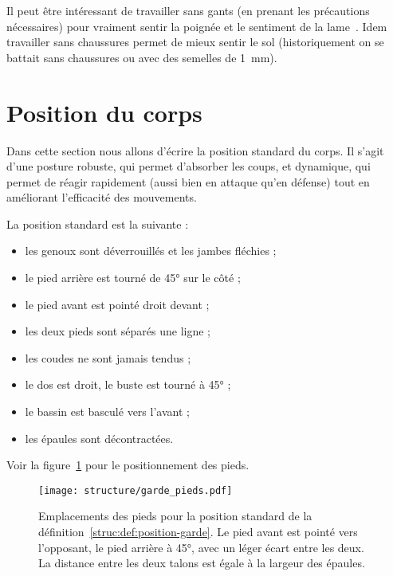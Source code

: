 Il peut être intéressant de travailler sans gants (en prenant les précautions nécessaires) pour vraiment sentir la poignée et le sentiment de la lame~\cite{enzi:dijon:messer_inner:2015}.
Idem travailler sans chaussures permet de mieux sentir le sol (historiquement on se battait sans chaussures ou avec des semelles de \SI{1}{mm}).


\section{Position du corps}


Dans cette section nous allons d'écrire la position standard du corps.
Il s'agit d'une posture robuste, qui permet d'absorber les coups, et dynamique, qui permet de réagir rapidement (aussi bien en attaque qu'en défense) tout en améliorant l'efficacité des mouvements.


\begin{definition}
\label{struc:def:position-garde}

\noindent
La position standard est la suivante :
\begin{itemize}
	\item les genoux sont déverrouillés et les jambes fléchies ;
	\item le pied arrière est tourné de \ang{45} sur le côté ;
	\item le pied avant est pointé droit devant ;
	\item les deux pieds sont séparés une ligne ;
	\item les coudes ne sont jamais tendus ;
	\item le dos est droit, le buste est tourné à \ang{45} ;
	\item le bassin est basculé vers l'avant ;
	\item les épaules sont décontractées.
\end{itemize}
Voir la figure~\ref{struc:fig:garde-pieds} pour le positionnement des pieds.
\end{definition}


\begin{figure}[ht]
	\centering
	\texttt{[image: structure/garde\_pieds.pdf]}
	\caption{Emplacements des pieds pour la position standard de la définition~\ref{struc:def:position-garde}.
	Le pied avant est pointé vers l'opposant, le pied arrière à \ang{45}, avec un léger écart entre les deux.
	La distance entre les deux talons est égale à la largeur des épaules.}
	\label{struc:fig:garde-pieds}
\end{figure}


